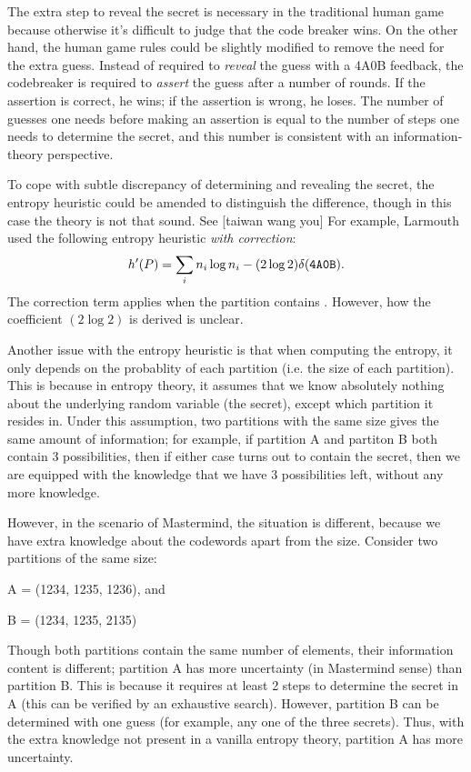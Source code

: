 The extra step to reveal the secret is necessary in the traditional human game because otherwise it's difficult to judge that the code breaker wins. On the other hand, the human game rules could be slightly modified to remove the need for the extra guess. Instead of required to \emph{reveal} the guess with a 4A0B feedback, the codebreaker is required to \emph{assert} the guess after a number of rounds. If the assertion is correct, he wins; if the assertion is wrong, he loses. The number of guesses one needs before making an assertion is equal to the number of steps one needs to determine the secret, and this number is consistent with an information-theory perspective.

To cope with subtle discrepancy of determining and revealing the secret, the entropy heuristic could be amended to distinguish the difference, though in this case the theory is not that sound. See [taiwan wang you] For example, Larmouth \cite{aleph71} used the following entropy heuristic \emph{with correction}:
\[
h'(P) = \sum_i n_i \log n_i - (2 \log 2) \delta(\texttt{{4}A{0}B})  .
\]
The correction term applies when the partition contains . However, how the coefficient $(2 \log 2)$ is derived is unclear.

Another issue with the entropy heuristic is that when computing the entropy, it only depends on the probablity of each partition (i.e. the size of each partition). This is because in entropy theory, it assumes that we know absolutely nothing about the underlying random variable (the secret), except which partition it resides in. Under this assumption, two partitions with the same size gives the same amount of information; for example, if partition A and partiton B both contain 3 possibilities, then if either case turns out to contain the secret, then we are equipped with the knowledge that we have 3 possibilities left, without any more knowledge.

However, in the scenario of Mastermind, the situation is different, because we have extra knowledge about the codewords apart from the size. Consider two partitions of the same size:

A = (1234, 1235, 1236), and

B = (1234, 1235, 2135)

Though both partitions contain the same number of elements, their information content is different; partition A has more uncertainty (in Mastermind sense) than partition B. This is because it requires at least 2 steps to determine the secret in A (this can be verified by an exhaustive search). However, partition B can be determined with one guess (for example, any one of the three secrets). Thus, with the extra knowledge not present in a vanilla entropy theory, partition A has more uncertainty.

